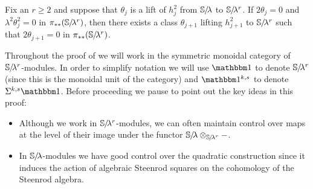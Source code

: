 \begin{thm} \label{thm:inductive}
  Fix an $r \geq 2$ and suppose that $\theta_j$ is a lift of $h_j^2$ from $\operatorname{\mathbb{S}}\hspace{-2.2pt}/\!\lambda$ to $\operatorname{\mathbb{S}}\hspace{-2.2pt}/\!\lambda^r$.
  If $2\theta_j = 0$ and $\lambda^2 \theta_j^2 = 0$ in $\pi_{**}(\operatorname{\mathbb{S}}\hspace{-2.2pt}/\!\lambda^r)$,
  then there exists a class $\theta_{j+1}$ lifting $h_{j+1}^2$ to $\operatorname{\mathbb{S}}\hspace{-2.2pt}/\!\lambda^r$ such that $2\theta_{j+1} = 0$ in $\pi_{**}(\operatorname{\mathbb{S}}\hspace{-2.2pt}/\!\lambda^r)$.
\end{thm}


Throughout the proof of  we will work in the symmetric monoidal category of $\operatorname{\mathbb{S}}\hspace{-2.2pt}/\!\lambda^r$-modules.
In order to simplify notation we will use $\o$ to denote $\operatorname{\mathbb{S}}\hspace{-2.2pt}/\!\lambda^r$ (since this is the monoidal unit of the category) and $\o^{k,s}$ to denote $\Sigma^{k,s}\o$.
Before proceeding we pause to point out the key ideas in this proof:
\begin{itemize}
\item Although we work in $\operatorname{\mathbb{S}}\hspace{-2.2pt}/\!\lambda^r$-modules, we can often maintain control over maps at the level of their image under the functor $\operatorname{\mathbb{S}}\hspace{-2.2pt}/\!\lambda \otimes_{\operatorname{\mathbb{S}}\hspace{-2.2pt}/\!\lambda^r} -$.%
\item In $\operatorname{\mathbb{S}}\hspace{-2.2pt}/\!\lambda$-modules we have good control over the quadratic construction since it induces the action of algebraic Steenrod squares on the cohomology of the Steenrod algebra.%
\end{itemize}

